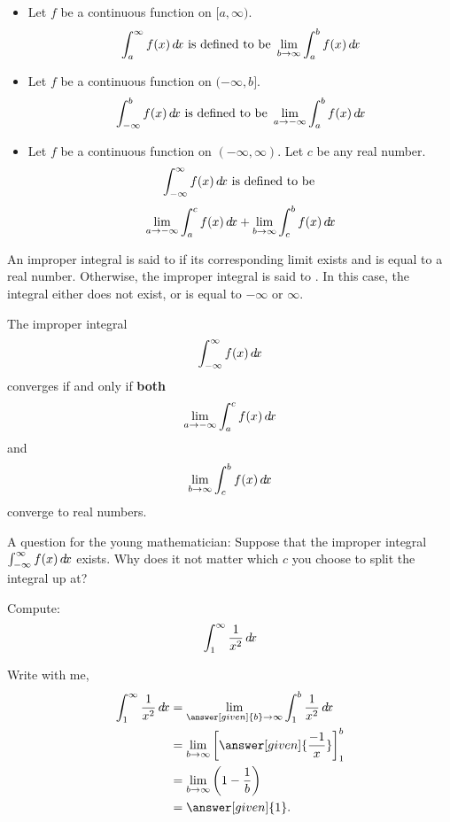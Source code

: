 \documentclass{ximera}
\begin{document}
\begin{definition}\hfil
\begin{itemize}
\item Let $f$ be a continuous function on $[a,\infty)$.
  \[
  \int_a^\infty f(x) \mathop{}\!d\! x \text{ is defined to be } \lim_{b\to\infty}\int_a^b f(x) \mathop{}\!d\! x
  \]
\item Let $f$ be a continuous function on $(-\infty,b]$.
  \[
  \int_{-\infty}^b f(x) \mathop{}\!d\! x \text{ is defined to be } \lim_{a\to-\infty}\int_a^b f(x) \mathop{}\!d\! x
  \]
\item Let $f$ be a continuous function on $(-\infty,\infty)$. Let $c$
  be any real number.
  \[
  \int_{-\infty}^\infty f(x) \mathop{}\!d\! x \text{ is defined to be }
  \]
  \[
  \lim_{a\to-\infty}\int_a^c f(x) \mathop{}\!d\! x + \lim_{b\to\infty}\int_c^b
  f(x) \mathop{}\!d\! x
  \]
\end{itemize}
An improper integral is said to  if its corresponding
limit exists and is equal to a real number. Otherwise, the improper
integral is said to . In this case, the integral either
does not exist, or is equal to $-\infty$ or $\infty$.
\end{definition}

\begin{warning}
  The improper integral
  \[
  \int_{-\infty}^\infty f(x) \mathop{}\!d\! x
  \]
  converges if and only if \textbf{both}
  \[
  \lim_{a\to-\infty}\int_a^c f(x) \mathop{}\!d\! x
  \]
  and
  \[
  \lim_{b\to\infty}\int_c^b
  f(x) \mathop{}\!d\! x
  \]
  converge to real numbers.
\end{warning}
A question for the young mathematician: Suppose that the improper
integral $\int_{-\infty}^\infty f(x) \mathop{}\!d\! x$ exists.  Why does it not
matter which $c$ you choose to split the integral up at?



\begin{example}	
 Compute:
 \[
 \int_1^\infty \frac{1}{x^2} \mathop{}\!d\! x
 \]
 \begin{explanation}
   Write with me,
   \begin{align*}
     \int_1^\infty \frac{1}{x^2} \d x &= \lim_{\answer[given]{b} \to \infty} \int_1^b \frac{1}{x^2} \d x\\
     &= \lim_{b \to \infty} \eval{\answer[given]{\frac{-1}{x}}}_1^b\\ 
     &= \lim_{b \to \infty} \left(1 - \frac{1}{b}\right)\\
     &= \answer[given]{1}.
   \end{align*}
 \end{explanation}
\end{example}
\end{document}

